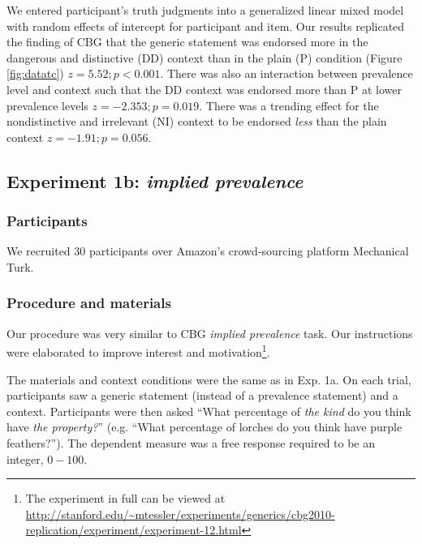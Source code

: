 \documentclass[10pt,letterpaper]{article}
\begin{document}

We entered participant's truth judgments into a generalized linear mixed model with random effects of intercept for participant and item.  Our results replicated the finding of CBG that the generic statement was endorsed more in the dangerous and distinctive (DD) context than in the plain (P) condition (Figure \ref{fig:datatc}) $z = 5.52; p < 0.001$. There was also an interaction between prevalence level and context such that the DD context was endorsed more than P at lower prevalence levels $z=-2.353; p = 0.019$. There was a trending effect for the nondistinctive and irrelevant (NI) context to be endorsed \emph{less} than the plain context $z=-1.91; p = 0.056$.

\subsection{Experiment 1b: \emph{implied prevalence}}

\subsubsection{Participants}

We recruited 30 participants over Amazon's crowd-sourcing platform Mechanical Turk.  

\subsubsection{Procedure and materials}

Our procedure was very similar to CBG \emph{implied prevalence} task. Our instructions were elaborated to improve interest and motivation\footnote{The experiment in full can be viewed at \url{http://stanford.edu/~mtessler/experiments/generics/cbg2010-replication/experiment/experiment-12.html}}. 

The materials and context conditions were the same as in Exp. 1a. 
On each trial, participants saw a generic statement (instead of a prevalence statement) and a context. 
Participants were then asked ``What percentage of \emph{the kind} do you think have \emph{the property?}'' (e.g. ``What percentage of lorches do you think have  purple feathers?''). The dependent measure was a free response required to be an integer, $0-100$. 
\end{document}
